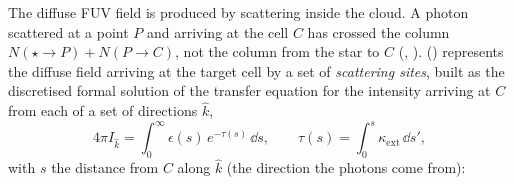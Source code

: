 The diffuse FUV field is produced by scattering inside the cloud. A photon
scattered at a point $P$ and arriving at the cell $C$ has crossed the column
$N(\star\to P)+N(P\to C)$, not the column from the star to $C$
(, ). 
() represents the diffuse field arriving at the
target cell by a set of \emph{scattering sites}, built as the discretised
formal solution of the transfer equation for the intensity arriving at $C$
from each of a set of directions $\hat k$,
\begin{equation}
  4\pi I_{\hat k} = \int_0^\infty \epsilon(s)\, e^{-\tau(s)}\,\dd s ,
  \qquad \tau(s)=\int_0^s \kappa_{\mathrm{ext}}\,\dd s',
  \label{eq:formal}
\end{equation}
with $s$ the distance from $C$ along $\hat k$ (the direction the photons come
from):
